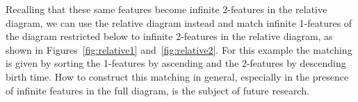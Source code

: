 Recalling that these same features become infinite 2-features in the relative diagram, we can use the relative diagram instead and match infinite 1-features of the diagram restricted below to infinite 2-features in the relative diagram, as shown in Figures~\ref{fig:relative1} and~\ref{fig:relative2}.
For this example the matching is given by sorting the 1-features by ascending and the 2-features by descending birth time.
How to construct this matching in general, especially in the presence of infinite features in the full diagram, is the subject of future research.
